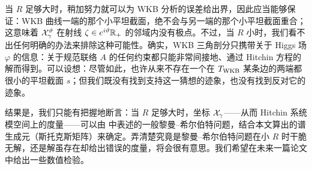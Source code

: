 当 $R$ 足够大时，稍加努力就可以为 WKB 分析的误差给出界，因此应当能够保证：WKB 曲线一端的那个小平坦截面，绝不会与另一端的那个小平坦截面重合；这意味着 $\mathcal{X}^\vartheta_\gamma$ 在射线 $\zeta\in e^{i\vartheta}\mathbb{R}_+$ 的邻域内没有极点。不过，当 $R$ 小时，我们看不出任何明确的办法来排除这种可能性。确实，WKB 三角剖分只携带关于 Higgs 场 $\varphi$ 的信息：关于规范联络 $A$ 的任何约束都只能非常间接地、通过 Hitchin 方程的解而得到。可以设想：尽管如此，也许从来不存在一个在 $T_{\rm WKB}$ 某条边的两端都很小的平坦截面 $s$；但我们既没有找到支持这一猜想的迹象，也没有找到反对它的迹象。

结果是，我们只能有把握地断言：当 $R$ 足够大时，坐标 $\mathcal{X}_\gamma$——从而 Hitchin 系统模空间上的度量——可以由 \cite{Gaiotto:2008cd} 中表述的一般黎曼–希尔伯特问题，结合本文算出的谱生成元（斯托克斯矩阵）来确定。弄清楚究竟是黎曼–希尔伯特问题在小 $R$ 时干脆无解，还是解虽存在却给出错误的度量，将会很有意思。我们希望在未来一篇论文中给出一些数值检验。
